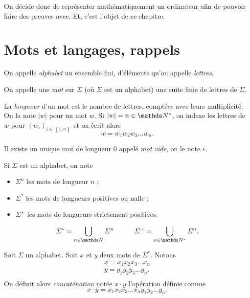 On décide donc de représenter mathématiquement un ordinateur afin de pouvoir faire des preuves avec. Et, c'est l'objet de ce chapitre.

\section{Mots et langages, rappels}

\begin{defn}
	On appelle {\it alphabet}\/ un ensemble fini, d'éléments qu'on appelle {\it lettres}.
\end{defn}

\begin{defn}
	On appelle une {\it mot}\/ sur $\Sigma$ (où $\Sigma$ est un alphabet) une suite finie de lettres de $\Sigma$.

	La {\it longueur}\/ d'un mot est le nombre de lettres, comptées avec leurs multiplicité. On la note $|w|$\/ pour un mot $w$.
	Si $|w| = n \in \N^*$, on indexe les lettres de $w$\/ pour $(w_i)_{i\in\left\llbracket 1,n \right\rrbracket}$ et on écrit alors \[
		w = w_1 w_2 w_3 \ldots w_n
	.\]

	Il existe un unique mot de longueur $0$\/ appelé {\it mot vide}, on le note $\varepsilon$.
\end{defn}

\begin{defn}
	Si $\Sigma$ est un alphabet, on note
	\begin{itemize}
		\item $\Sigma^n$\/ les mots de longueur $n$\/ ;
		\item $\Sigma^*$\/ les mots de longueurs positives ou nulle ;
		\item $\Sigma^+$\/ les mots de longueurs strictement positives.
	\end{itemize}
\end{defn}

\begin{rmk}
	\[
		\Sigma^* = \bigcup_{n \in \N} \Sigma^n \quad\quad\quad \Sigma^+ = \bigcup_{n \in \N^*} \Sigma^n
	.\]
\end{rmk}

\begin{defn}
	Soit $\Sigma$ un alphabet. Soit $x$\/ et $y$\/ deux mots de $\Sigma^*$. Notons
	\begin{gather*}
		x = x_1x_2x_3\ldots x_n\\
		y = y_1y_2y_3\ldots y_n.\\
	\end{gather*}
	On définit alors {\it concaténation}\/ notée $x \cdot y$\/ l'opération définie comme \[
		x \cdot y = x_1x_2x_3\ldots x_n y_1y_2\ldots y_n
	.\]
\end{defn}

